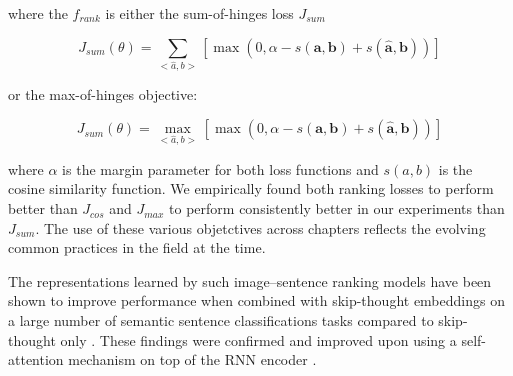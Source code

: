 where the $f_{rank}$ is either the sum-of-hinges loss $J_{sum}$

\begin{equation}
\label{eq:sumviol}
J_{sum}(\theta) = \sum_{<\hat{a},b>}[\max(0, \alpha - s(\mathbf{a},\mathbf{b}) + s(\hat{\mathbf{a}}, \mathbf{b}))] 
\end{equation}

or the max-of-hinges objective:

\begin{equation}
\label{eq:maxviol}
J_{sum}(\theta) = \max_{<\hat{a}, b>}[\max(0, \alpha - s(\mathbf{a},\mathbf{b}) + s(\hat{\mathbf{a}}, \mathbf{b}))]
\end{equation}

where $\alpha$ is the margin parameter for both loss functions and $s(a, b)$ is the cosine similarity
function.
We empirically found both ranking losses to perform better than $J_{cos}$ and $J_{max}$ to perform
consistently better in our experiments than $J_{sum}$. The use of these various objetctives across
chapters  reflects the evolving common practices in the field at the time. 




The representations learned by such image--sentence  ranking models have 
been shown 
to improve performance when combined with skip-thought embeddings
on a large number of semantic sentence classifications tasks compared to
skip-thought only \citep{kiela2017learning}. These findings were confirmed and improved upon using a
self-attention mechanism on top of the RNN encoder \citep{yoo2017improving}.


